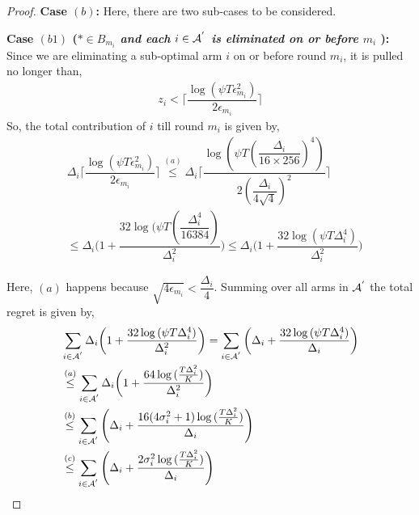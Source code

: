 \begin{proof}
\textbf{Case $(b)$:} Here, there are two sub-cases to be considered.

\noindent
\textbf{Case $(b1)$ (\textit{${*}\in B_{m_{i}}$ and each ${i}\in \mathcal{A}^{'}$ is  eliminated on or before $m_{i}$ }): } Since we are eliminating a sub-optimal arm ${i}$ on or before round $m_{i}$, it is pulled no longer than, 
 \begin{align*}
 z_{i} < \bigg\lceil\dfrac{\log{(\psi T\epsilon_{m_{i}}^{2})}}{2\epsilon_{m_{i}}}\bigg\rceil
 \end{align*}
So, the total contribution of ${i}$  till round $m_{i}$ is given by, 
\begin{align*}
&\Delta_{i}\bigg\lceil\dfrac{\log{(\psi T\epsilon_{m_{i}}^{2})}}{2\epsilon_{m_{i}}}\bigg\rceil
\overset{(a)}{\leq}    \Delta_{i}\bigg\lceil\dfrac{\log{(\psi T(\dfrac{\Delta_{i}}{16 \times 256})^{4})}}{2(\dfrac{\Delta_{i}}{4\sqrt{4}})^{2}}\bigg\rceil \\
&\leq   \Delta_{i}\bigg(1+\dfrac{32\log{(\psi T(\dfrac{\Delta_{i}^{4}}{16384})}}{\Delta_{i}^{2}}\bigg)
\leq \Delta_{i}\bigg(1+\dfrac{32\log{(\psi T\Delta_{i}^{4})}}{\Delta_{i}^{2}}\bigg) 
\end{align*} 

Here, $(a)$ happens because $\sqrt{4\epsilon_{m_{i}}} < \dfrac{\Delta_{i}}{4}$. Summing over all arms in $\mathcal{A}^{'}$ the total regret is given by, 
\begin{align*}
&\sum_{i\in \A^{'}}\Delta_{i}\bigg(1+\dfrac{32\log{(\psi T\Delta_{i}^{4}})}{\Delta_{i}^{2}}\bigg) = \sum_{i\in \A^{'}}\bigg(\Delta_{i} +\dfrac{32\log{(\psi T\Delta_{i}^{4}})}{\Delta_{i}}\bigg) \\
&\overset{(a)}{\leq} \sum_{i\in \A^{'}} \Delta_{i}\bigg(1+\dfrac{64\log{( \frac{T\Delta_{i}^{2}}{K})}}{\Delta_{i}^{2}}\bigg)\\
&\overset{(b)}{\leq} \sum_{i\in \A^{'}} \left(\Delta_{i} +\dfrac{16(4\sigma_i^2 + 1)\log{( \frac{T\Delta_{i}^{2}}{K})}}{\Delta_{i}}\right)\\
&%
\overset{(c)}{\leq} \sum_{i\in \A^{'}} \left(\Delta_{i} +\dfrac{2\sigma_i^2\log{( \frac{T\Delta_{i}^{2}}{K})}}{\Delta_{i}}\right)\\
\end{align*}


\end{proof}
